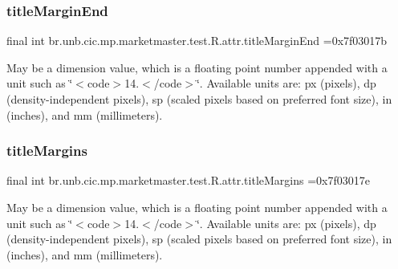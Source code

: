 \subsubsection{\texorpdfstring{title\+Margin\+End}{titleMarginEnd}}
{\footnotesize\ttfamily final int br.\+unb.\+cic.\+mp.\+marketmaster.\+test.\+R.\+attr.\+title\+Margin\+End =0x7f03017b\hspace{0.3cm}{\ttfamily [static]}}

May be a dimension value, which is a floating point number appended with a unit such as \char`\"{}$<$code$>$14.\+5sp$<$/code$>$\char`\"{}. Available units are\+: px (pixels), dp (density-\/independent pixels), sp (scaled pixels based on preferred font size), in (inches), and mm (millimeters). \mbox{\label{classbr_1_1unb_1_1cic_1_1mp_1_1marketmaster_1_1test_1_1R_1_1attr_a182205cca0a9f54114595e57cc23d795}} 
\subsubsection{\texorpdfstring{title\+Margins}{titleMargins}}
{\footnotesize\ttfamily final int br.\+unb.\+cic.\+mp.\+marketmaster.\+test.\+R.\+attr.\+title\+Margins =0x7f03017e\hspace{0.3cm}{\ttfamily [static]}}

May be a dimension value, which is a floating point number appended with a unit such as \char`\"{}$<$code$>$14.\+5sp$<$/code$>$\char`\"{}. Available units are\+: px (pixels), dp (density-\/independent pixels), sp (scaled pixels based on preferred font size), in (inches), and mm (millimeters). \mbox{\label{classbr_1_1unb_1_1cic_1_1mp_1_1marketmaster_1_1test_1_1R_1_1attr_aa88902b6f5a6374d363ad41a8db3d506}} 
